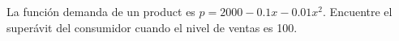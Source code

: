 \item La función demanda de un product es $p = 2000 - 0.1x - 0.01x^2$. Encuentre el superávit del consumidor cuando el nivel de ventas es 100.
